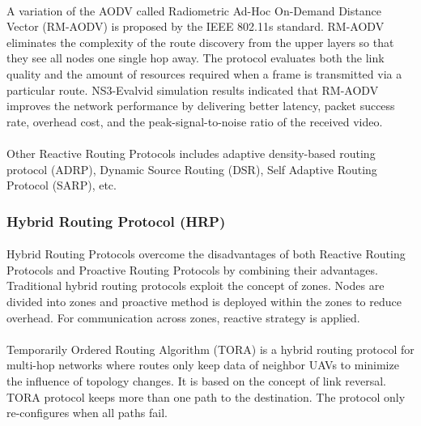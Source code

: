 \documentclass[a4paper,12pt]{report}
\begin{document}
\paragraph{}
A variation of the AODV called Radiometric Ad-Hoc On-Demand Distance Vector (RM-AODV) is proposed by the IEEE 802.11s standard\cite{topobased}. RM-AODV eliminates the complexity of the route discovery from the upper layers so that they see all nodes one single hop away\cite{topobased}. The protocol evaluates both the link quality and the amount of resources required when a frame is transmitted via a particular route. NS3-Evalvid simulation results indicated that RM-AODV improves the network performance by delivering better latency, packet success rate, overhead cost, and the peak-signal-to-noise ratio of the received video\cite{katila2017routing}.

\paragraph{}
Other Reactive Routing Protocols includes adaptive density-based routing protocol (ADRP)\cite{zheng2017adaptive}, Dynamic Source Routing (DSR)\cite{alshabtat2011low}, Self Adaptive Routing Protocol (SARP)\cite{elwhishi2009sarp}, etc.

\subsubsection{Hybrid Routing Protocol (HRP)}
\paragraph{}
Hybrid Routing Protocols overcome the disadvantages of both Reactive Routing Protocols and Proactive Routing Protocols by combining their advantages\cite{topobased}. Traditional hybrid routing protocols exploit the concept of zones\cite{haas2001zone, wang2004two}. Nodes are divided into zones and proactive method is deployed within the zones to reduce overhead. For communication across zones, reactive strategy is applied. 

\paragraph{}
Temporarily Ordered Routing Algorithm (TORA) is a hybrid routing protocol for multi-hop networks where routes only keep data of neighbor UAVs to minimize the influence of topology changes\cite{8772093}. It is based on the concept of link reversal\cite{gupta2010performance}. TORA protocol keeps more than one path to the destination. The protocol only re-configures when all paths fail.
\end{document}
